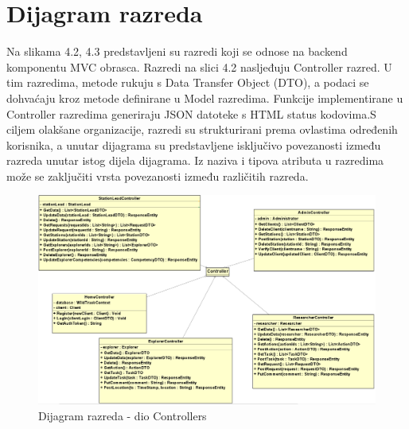 			\eject
			
			
		\section{Dijagram razreda}
		
			Na slikama 4.2, 4.3 predstavljeni su razredi koji se odnose na backend komponentu MVC obrasca. Razredi na slici 4.2 nasljeđuju Controller razred. U tim razredima, metode rukuju s Data Transfer Object (DTO), a podaci se dohvaćaju kroz metode definirane u Model razredima. Funkcije implementirane u Controller razredima generiraju JSON datoteke s HTML status kodovima.S ciljem olakšane organizacije, razredi su strukturirani prema ovlastima određenih korisnika, a unutar dijagrama su predstavljene isključivo povezanosti između razreda unutar istog dijela dijagrama. Iz naziva i tipova atributa u razredima može se zaključiti vrsta povezanosti između različitih razreda.
			
			\vspace{90pt}
			
			
			\begin{figure}[H]
				\centering
				\includegraphics[width=\textwidth]{slike/Controlleri.PNG}
				\caption{Dijagram razreda - dio Controllers}
				\label{fig:dijagram_baze}
			\end{figure}
			
